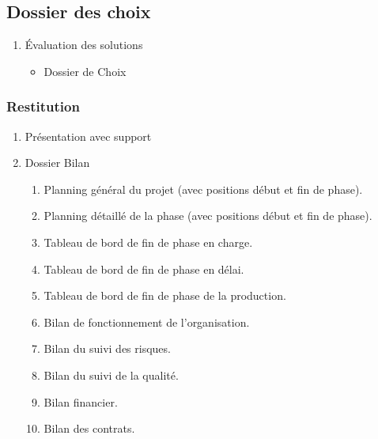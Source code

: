 \subsection{Dossier des choix}
		\begin{enumerate}
			\item Évaluation des solutions
				\begin{itemize}
					\item Dossier de Choix
				\end{itemize}
		\end{enumerate}

\subsubsection{Restitution}
		\begin{enumerate}
			\item Présentation avec support 
			\item Dossier Bilan
				\begin{enumerate}
					\item Planning général du projet
                        (avec positions début et fin de phase).
					\item Planning détaillé de la phase
                        (avec positions début et fin de phase).
					\item Tableau de bord de fin de phase en charge.
					\item Tableau de bord de fin de phase en délai.
					\item Tableau de bord de fin de phase de la production.
					\item Bilan de fonctionnement de l'organisation.
					\item Bilan du suivi des risques.
					\item Bilan du suivi de la qualité.
					\item Bilan financier.
					\item Bilan des contrats.
				\end{enumerate}
		\end{enumerate}
				
